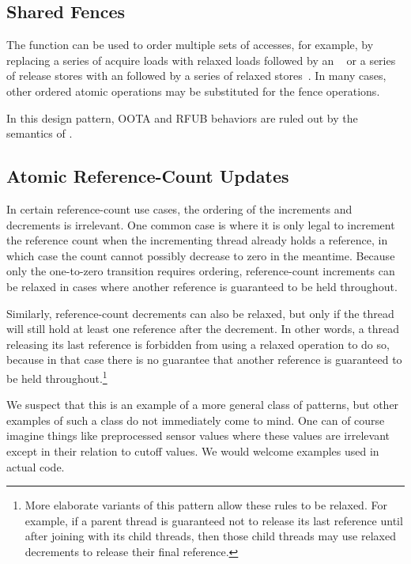 \documentclass[10]{article}
\begin{document}
\subsection{Shared Fences}
\label{sec:Shared Fences}

The  function can be used to order
multiple sets of accesses, for example, by replacing a series of
acquire loads with relaxed loads followed by an
~\cite[Section 4.1]{RaulSilvera2007WeakMemoryModel}
or a series of release stores with an
 followed by
a series of relaxed stores~\cite[Section 4.2]{RaulSilvera2007WeakMemoryModel}.
In many cases, other ordered atomic operations may be substituted for
the fence operations.

In this design pattern, OOTA and RFUB behaviors are ruled out by the semantics
of .

\subsection{Atomic Reference-Count Updates}
\label{sec:Atomic Reference-Count Updates}

In certain reference-count use cases, the ordering of the increments and
decrements is irrelevant.
One common case is where it is only legal to increment the reference
count when the incrementing thread already holds a reference, in which
case the count cannot possibly decrease to zero in the meantime.
Because only the one-to-zero transition requires ordering, reference-count
increments can be relaxed in cases where another reference is guaranteed
to be held throughout.

Similarly, reference-count decrements can also be relaxed, but only if
the thread will still hold at least one reference after the decrement.
In other words, a thread releasing its last reference is forbidden
from using a relaxed operation to do so, because in that case there
is no guarantee that another reference is guaranteed to be held
throughout.\footnote{
	More elaborate variants of this pattern allow these rules to
	be relaxed.
	For example, if a parent thread is guaranteed not to release
	its last reference until after joining with its child threads,
	then those child threads may use relaxed decrements to release
	their final reference.}

We suspect that this is an example of a more general class of patterns,
but other examples of such a class do not immediately come to mind.
One can of course imagine things like preprocessed sensor values where
these values are irrelevant except in their relation to cutoff values.
We would welcome examples used in actual code.
\end{document}
